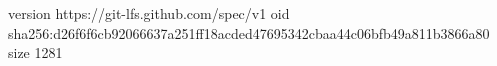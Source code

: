version https://git-lfs.github.com/spec/v1
oid sha256:d26f6f6cb92066637a251ff18acded47695342cbaa44c06bfb49a811b3866a80
size 1281
